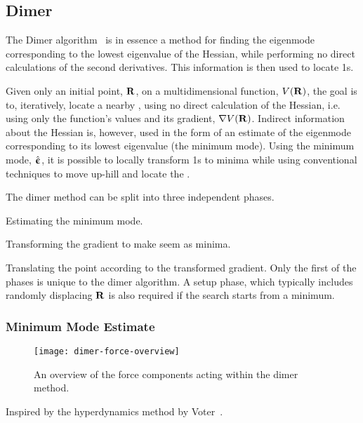 \subsection{Dimer}
\label{sec:dimer}

The Dimer algorithm~\cite{dimer-original-1999} is in essence a method for finding the eigenmode corresponding to the lowest eigenvalue of the Hessian, while performing no direct calculations of the second derivatives.
This information is then used to locate \sap1s.


Given only an initial point, ${\mathrm{\mathbf{\bm{R}}}}$, on a multidimensional function, $V({\mathrm{\mathbf{\bm{R}}}})$, the goal is to, iteratively, locate a nearby , using no direct calculation of the Hessian, i.e. using only the function's values and its gradient, $\nabla V({\mathrm{\mathbf{\bm{R}}}})$.
Indirect information about the Hessian is, however, used in the form of an estimate of the eigenmode corresponding to its lowest eigenvalue (the minimum mode).
Using the minimum mode, $\hat{{\mathrm{\mathbf{\bm{\upepsilon}}}}}$, it is possible to locally transform \sap1s to minima while using conventional techniques to move up-hill and locate the .

The dimer method can be split into three independent phases.
\item Estimating the minimum mode.
\item Transforming the gradient to make  seem as minima.
\item Translating the point according to the transformed gradient.
\een
Only the first of the phases is unique to the dimer algorithm.
A setup phase, which typically includes randomly displacing ${\mathrm{\mathbf{\bm{R}}}}$ is also required if the search starts from a minimum.
\recent

\subsubsection{Minimum Mode Estimate}
\begin{figure}[t]
  \begin{center}
    \texttt{[image: dimer-force-overview]}
    \caption{An overview of the force components acting within the dimer method. \expand
}
    \label{fig:dimer-force-overview}
  \end{center}
\end{figure}

Inspired by the hyperdynamics method by Voter~\cite{voter-hyperdynamics-1997}.

